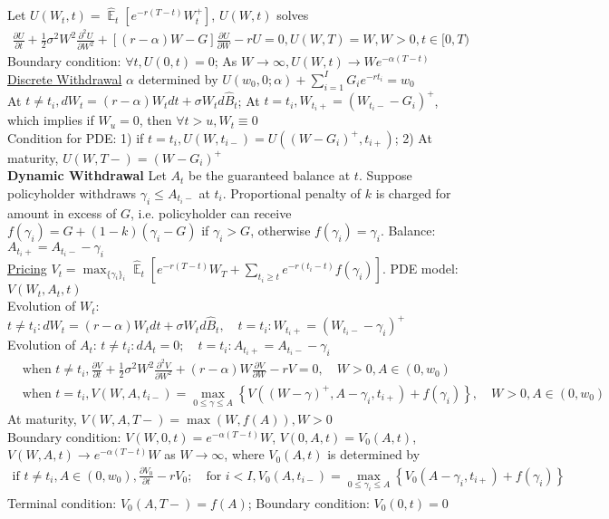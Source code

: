 \documentclass[12pt,landscape, a4paper]{article}
\theoremstyle{remark}
\newcommand{\E}{\operatorname{\mathbb{E}}}
\newcommand{\dd}{\partial}
\begin{document}
\begin{multicols*}{3}
Let $U (W_t, t) = \hat{\E}_t \left[e^{-r(T-t) } W^+_t\right]$, $U(W, t)$ solves
\begin{align*}
    \frac{\partial U}{\partial t} + \frac{1}{2} \sigma^2 W^2 \frac{\partial^2 U}{\partial W^2} + [(r-\alpha) W - G] \frac{\partial U}{\partial W} - rU = 0, U(W, T) = W, W>0, t \in [0, T)
\end{align*}
Boundary condition: $\forall t, U(0, t) = 0$; As $W \to \infty, U(W, t) \to W e^{-\alpha (T-t)}$\\
\underline{Discrete Withdrawal} $\alpha$ determined by $U(w_0, 0;\alpha) + \sum^I_{i=1} G_i e^{-r t_i} = w_0$\\
At $t\neq t_i, dW_t = (r-\alpha) W_t dt + \sigma W_t d\hat{B}_t$; At $t=t_i, W_{t_i+} = (W_{t_i -} -G_i)^+$, which implies if $W_u= 0$, then $\forall t>u, W_t \equiv 0$\\
Condition for PDE: 1) if $t=t_i, U(W, t_{i-}) = U ((W-G_i)^+, t_{i+})$; 2) At maturity, $U(W, T-) = (W-G_i)^+$\\

\textbf{Dynamic Withdrawal} Let $A_t$ be the guaranteed balance at $t$. Suppose policyholder withdraws $\gamma_i \leq A_{t_i-}$ at $t_i$. Proportional penalty of $k$ is charged for amount in excess of $G$, i.e. policyholder can receive $f(\gamma_i) = G + (1-k)(\gamma_i-G)$ if $\gamma_i > G$, otherwise $f(\gamma_i) = \gamma_i$. Balance: $A_{t_i+} = A_{t_i-} -\gamma_i$\\

\underline{Pricing} $V_t = \max_{\{\gamma_i\}_{i}} \hat{\E}_t \left[e^{-r (T-t)} W_T + \sum_{t_i \geq t} e^{-r (t_i - t)} f(\gamma_i) \right] $. PDE model: $V(W_t, A_t, t)$\\
Evolution of $W_t$: $t\neq t_i: d W_t = (r-\alpha) W_t dt + \sigma W_t d\hat{B}_t, \quad t=t_i: W_{t_i+} = (W_{t_i-} - \gamma_i)^+$\\
Evolution of $A_t$: $t\neq t_i: d A_t = 0; \quad t = t_i: A_{t_i+} = A_{t_i-} - \gamma_i$
\begin{align*}
    &\text{when }t \neq t_i, \frac{\dd V}{\dd t} + \frac{1}{2} \sigma^2 W^2 \frac{\dd^2 V}{\dd W^2} + (r-\alpha) W \frac{\dd V}{\dd W} - rV= 0,\quad  W>0, A \in (0, w_0)\\
    &\text{when }t = t_i, V(W, A, t_{i-}) = \max_{0\leq \gamma\leq A} \left\{V \left((W - \gamma )^+, A - \gamma_i, t_{i+} \right) + f(\gamma_i) \right\}, \quad  W>0, A \in (0, w_0)
\end{align*}
At maturity, $V(W, A, T-) = \max (W, f(A)), W>0$\\
Boundary condition: $V(W, 0, t) = e^{-\alpha (T-t)}W$, $V(0, A, t) = V_0 (A, t)$, $V(W, A, t) \to e^{-\alpha (T-t)}W$ as $W\to \infty$,
where $V_0 (A, t)$ is determined by
\begin{align*}
    \text{if } t\neq t_i, A \in (0, w_0), \frac{\dd V_0}{\dd t} - rV_0; \quad \text{for }i < I, V_0 (A, t_{i-}) = \max_{0\leq \gamma_i \leq A} \left\{V_0 (A - \gamma_i, t_{i+})+ f(\gamma_i) \right\}
\end{align*}
Terminal condition: $V_0 (A, T-) = f(A)$; Boundary condition: $V_0 (0, t) = 0$\\


\end{multicols*}
\end{document}
